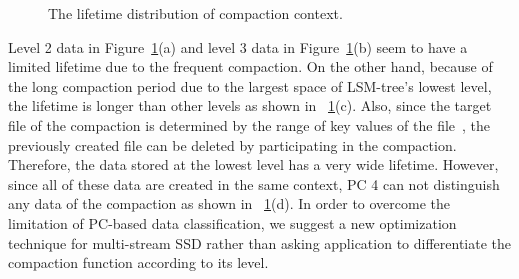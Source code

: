 \begin{figure}[!t]
\centering
\hspace{1pt}
\hfill
\vspace{-10pt}
\vspace{-10pt}
\caption{The lifetime distribution of compaction context.} 
\label{fig:compaction}
\vspace{-25pt}
\end{figure}

Level 2 data in Figure~\ref{fig:compaction}(a) and 
level 3 data in Figure~\ref{fig:compaction}(b) seem to have 
a limited lifetime due to the frequent compaction.
On the other hand, because of the long compaction period 
due to the largest space of LSM-tree's lowest level, 
the lifetime is longer than other levels as shown in ~\ref{fig:compaction}(c).
Also, since the target file of the compaction is determined 
by the range of key values of the file~\cite{RocksDB}, 
the previously created file can be deleted 
by participating in the compaction. 
Therefore, the data stored at the lowest level has a very wide lifetime.
However, since all of these data are created in the same context, 
PC 4 can not distinguish any data of the compaction as shown in ~\ref{fig:compaction}(d).
In order to overcome the limitation of PC-based data classification,
we suggest a new optimization technique for multi-stream SSD 
rather than asking application to differentiate the compaction function according to its level.

